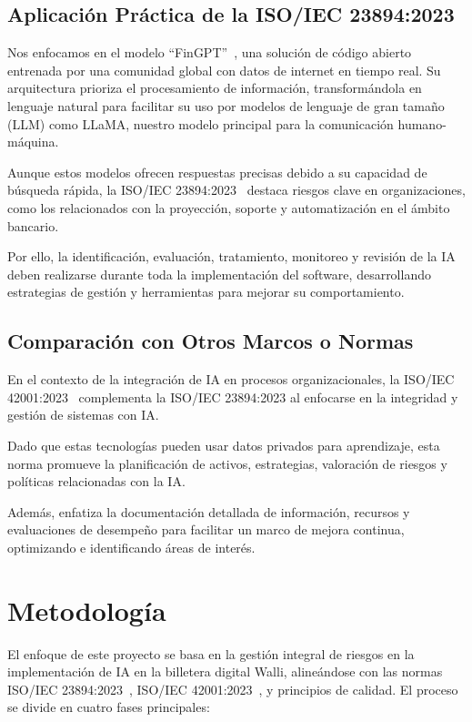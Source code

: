 \documentclass[12pt]{article}
\begin{document}
\subsection{Aplicación Práctica de la ISO/IEC 23894:2023}
Nos enfocamos en el modelo ``FinGPT''~\cite{wang2023}, una solución de código abierto entrenada 
por una comunidad global con datos de internet en tiempo real. Su arquitectura prioriza el procesamiento 
de información, transformándola en lenguaje natural para facilitar su uso por modelos de lenguaje de 
gran tamaño (LLM) como LLaMA, nuestro modelo principal para la comunicación humano-máquina. 

Aunque estos modelos ofrecen respuestas precisas debido a su capacidad de búsqueda rápida, 
la ISO/IEC 23894:2023~\cite{iso23894} destaca riesgos clave en organizaciones, como los relacionados 
con la proyección, soporte y automatización en el ámbito bancario. 

Por ello, la identificación, evaluación, tratamiento, monitoreo y revisión de la IA deben realizarse 
durante toda la implementación del software, desarrollando estrategias de gestión y herramientas 
para mejorar su comportamiento.

\subsection{Comparación con Otros Marcos o Normas}
En el contexto de la integración de IA en procesos organizacionales, la ISO/IEC 42001:2023~\cite{intedya} 
complementa la ISO/IEC 23894:2023 al enfocarse en la integridad y gestión de sistemas con IA. 

Dado que estas tecnologías pueden usar datos privados para aprendizaje, esta norma promueve 
la planificación de activos, estrategias, valoración de riesgos y políticas relacionadas con la IA. 

Además, enfatiza la documentación detallada de información, recursos y evaluaciones de desempeño 
para facilitar un marco de mejora continua, optimizando e identificando áreas de interés.

\section{Metodología}
\label{sec:metodologia}

El enfoque de este proyecto se basa en la gestión integral de riesgos en la implementación de IA 
en la billetera digital Walli, alineándose con las normas ISO/IEC 23894:2023~\cite{iso23894}, 
ISO/IEC 42001:2023~\cite{intedya}, y principios de calidad. El proceso se divide en cuatro fases principales:
\end{document}
